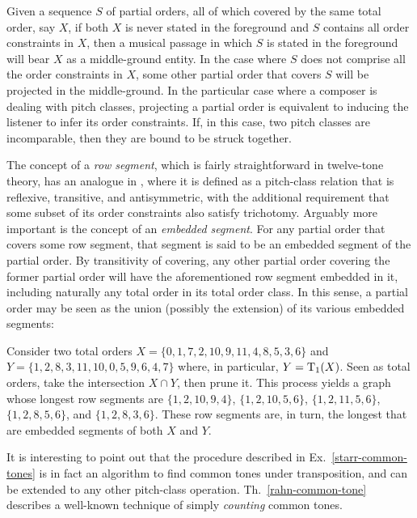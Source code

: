 \begin{example}
    \cite[197]{Starr1984}
    Given a sequence $S$ of partial orders, all of which covered by the same total order, say $X$, if both $X$ is never stated in the foreground and $S$ contains all order constraints in $X$, then a musical passage in which $S$ is stated in the foreground will bear $X$ as a middle-ground entity. In the case where $S$ does not comprise all the order constraints in $X$, some other partial order that covers $S$ will be projected in the middle-ground. In the particular case where a composer is dealing with pitch classes, projecting a partial order is equivalent to inducing the listener to infer its order constraints. If, in this case, two pitch classes are incomparable, then they are bound to be struck together.
\end{example}

The concept of a \emph{row segment}, which is fairly straightforward in twelve-tone theory, has an analogue in \cite[198]{Starr1984}, where it is defined as a pitch-class relation that is reflexive, transitive, and antisymmetric, with the additional requirement that some subset of its order constraints also satisfy trichotomy. Arguably more important is the concept of an \emph{embedded segment}. For any partial order that covers some row segment, that segment is said to be an embedded segment of the partial order. By transitivity of covering, any other partial order covering the former partial order will have the aforementioned row segment embedded in it, including naturally any total order in its total order class. In this sense, a partial order may be seen as the union (possibly the extension) of its various embedded segments:

\begin{example}
    \label{starr-common-tones}
    \cite[200]{Starr1984}
    Consider two total orders $X = \{ 0, 1, 7, 2, 10, 9, 11, 4, 8, 5, 3, 6 \}$ and $Y = \{ 1, 2, 8, 3, 11, 10, 0, 5, 9, 6, 4, 7 \}$ where, in particular, $Y = \operatorname{T}_1(X)$. Seen as total orders, take the intersection $X \cap Y$, then prune it. This process yields a graph whose longest row segments are $\{ 1, 2, 10, 9, 4 \}$, $\{ 1, 2, 10, 5, 6 \}$, $\{ 1, 2, 11, 5, 6 \}$, $\{ 1, 2, 8, 5, 6 \}$, and $\{ 1, 2, 8, 3, 6 \}$. These row segments are, in turn, the longest that are embedded segments of both $X$ and $Y$.
\end{example}

It is interesting to point out that the procedure described in Ex.~\ref{starr-common-tones} is in fact an algorithm to find common tones under transposition, and can be extended to any other pitch-class operation. Th.~\ref{rahn-common-tone} describes a well-known technique of simply \emph{counting} common tones.


